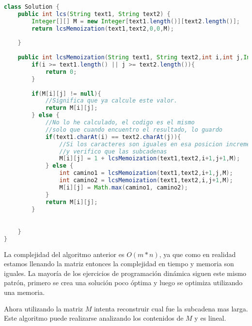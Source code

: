 \begin{lstlisting}[language=Java, caption=LCS optimo recursivo]
class Solution {
    public int lcs(String text1, String text2) {
        Integer[][] M = new Integer[text1.length()][text2.length()];
        return lcsMemoization(text1,text2,0,0,M);
        
    }
    
    public int lcsMemoization(String text1, String text2,int i,int j,Integer[][] M) {
        if(i >= text1.length() || j >= text2.length()){
            return 0;
        } 
        
        if(M[i][j] != null){
            //Significa que ya calcule este valor.
            return M[i][j];
        } else {
            //No lo he calculado, el codigo es el mismo
            //solo que cuando encuentro el resultado, lo guardo
            if(text1.charAt(i) == text2.charAt(j)){
                //Si los caracteres son iguales en esa posicion incremento en 1 mi resultado
                //y verifico que las subcadenas
                M[i][j] = 1 + lcsMemoization(text1,text2,i+1,j+1,M);
            } else {
                int camino1 = lcsMemoization(text1,text2,i+1,j,M);
                int camino2 = lcsMemoization(text1,text2,i,j+1,M);
                M[i][j] = Math.max(camino1, camino2); 
            }
            return M[i][j];
        }
        

    }
}
\end{lstlisting}

La complejidad del algoritmo anterior es $O(m*n)$, ya que como en realidad estamos llenando la matriz entonces la complejidad en tiempo y memoria son iguales. La mayoría de los ejercicios de programación dinámica siguen este mismo patrón, primero se crea una solución poco óptima y luego se optimiza utilizando una memoria.  

 Ahora utilizando la matriz $M$ intenta reconstruir cual fue la subcadena mas larga. Este algoritmo puede realizarse analizando los contenidos de $M$ y es lineal.